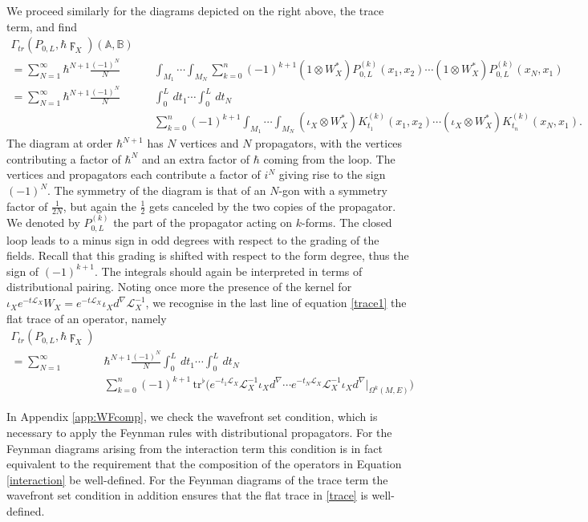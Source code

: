 \documentclass[reqno]{amsart}
\theoremstyle{definition}
\theoremstyle{remark}
\newcommand{\A}{\mathbb{A}}
\newcommand{\B}{\mathbb{B}}
\renewcommand{\d}{d^\nabla}
\newcommand{\h}{\hbar}
\renewcommand{\L}{\mathcal{L}}
\newcommand{\tr}{\mathrm{tr}^\flat}
\begin{document}
We proceed similarly for the diagrams depicted on the right above, the trace term, and find
\begin{equation}
\label{trace1}
\begin{split}
    \Gamma_{tr}(P_{0,L},\h \digamma_X)(\A,\B)\quad& \\
    = \sum_{N=1}^\infty \h^{N+1}\frac{(-1)^N}{N} &\int_{M_1}\cdots\int_{M_N} \sum_{k=0}^n (-1)^{k+1} (1\otimes W_X^*)P_{0,L}^{(k)}(x_1,x_2)\cdots(1\otimes W_X^*)P_{0,L}^{(k)}(x_N,x_1) \\
    = \sum_{N=1}^\infty \h^{N+1}\frac{(-1)^N}{N} &\int_0^L\,dt_1\cdots\int_0^L\,dt_N \\
    &\sum_{k=0}^n (-1)^{k+1} \int_{M_1}\cdots\int_{M_N}
    (\iota_X\otimes W_X^*)K_{t_1}^{(k)}(x_1,x_2)\cdots(\iota_X\otimes W_X^*)K_{t_n}^{(k)}(x_N,x_1).
\end{split}
\end{equation}
The diagram at order $\h^{N+1}$ has $N$ vertices and $N$ propagators, with the vertices contributing a factor of $\h^N$ and an extra factor of $\h$ coming from the loop. The vertices and propagators each contribute a factor of $i^N$ giving rise to the sign $(-1)^N$. The symmetry of the diagram is that of an $N$-gon with a symmetry factor of $\frac{1}{2N}$, but again the $\frac{1}{2}$ gets canceled by the two copies of the propagator. We denoted by $P_{0,L}^{(k)}$ the part of the propagator acting on $k$-forms. The closed loop leads to a minus sign in odd degrees with respect to the grading of the fields. Recall that this grading is shifted with respect to the form degree, thus the sign of $(-1)^{k+1}$.
The integrals should again be interpreted in terms of distributional pairing. Noting once more the presence of the kernel for $\iota_X e^{-t\L_X} W_X= e^{-t\L_X}\iota_X\d\L_X^{-1}$, we recognise in the last line of equation \eqref{trace1} the flat trace of an operator, namely
\begin{equation}
\begin{split}
\label{trace}
    \Gamma_{tr}(P_{0,L},\h \digamma_X)  & \\
    =\sum_{N=1}^\infty &\h^{N+1}\frac{(-1)^N}{N} \int_0^L\,dt_1\cdots\int_0^L\,dt_N\, \\
    &\sum_{k=0}^n (-1)^{k+1}\, \tr\big(e^{-t_1\L_X} \L_X^{-1}\iota_X\d \cdots e^{-t_N\L_X} \L_X^{-1}\iota_X\d\big|_{\Omega^k(M,E)}\big)
\end{split}
\end{equation}



\begin{rmk}
In Appendix \ref{app:WFcomp}, we check the wavefront set condition, which is necessary to apply the Feynman rules with distributional propagators. For the Feynman diagrams arising from the interaction term this condition is in fact equivalent to the requirement that the composition of the operators in Equation \eqref{interaction} be well-defined. For the Feynman diagrams of the trace term the wavefront set condition in addition ensures that the flat trace in \eqref{trace} is well-defined.
\end{rmk}
\end{document}
